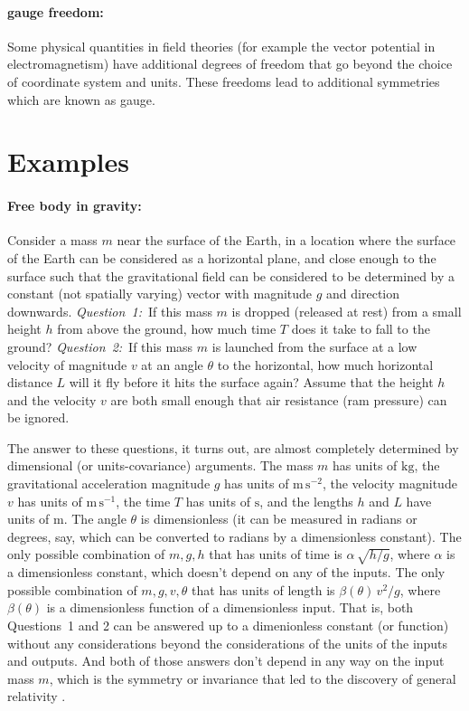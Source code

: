 \documentclass{article}
\newcommand{\unit}[1]{\mathrm{#1}}
\newcommand{\kg}{\unit{kg}}
\newcommand{\m}{\unit{m}}
\newcommand{\s}{\unit{s}}
\begin{document}
\paragraph{gauge freedom:}
Some physical quantities in field theories (for example the vector potential in electromagnetism) have additional degrees of freedom that go beyond the choice of coordinate system and units.
These freedoms lead to additional symmetries which are known as gauge.

\section{Examples}

\paragraph{Free body in gravity:}
Consider a mass $m$ near the surface of the Earth, in a location where the surface of the Earth can be considered as a horizontal plane, and close enough to the surface such that the gravitational field can be considered to be determined by a constant (not spatially varying) vector with magnitude $g$ and direction downwards.
\textsl{Question~1:}~If this mass $m$ is dropped (released at rest) from a small height $h$ from above the ground, how much time $T$ does it take to fall to the ground?
\textsl{Question~2:}~If this mass $m$ is launched from the surface at a low velocity of magnitude $v$ at an angle $\theta$ to the horizontal, how much horizontal distance $L$ will it fly before it hits the surface again?
Assume that the height $h$ and the velocity $v$ are both small enough that air resistance (ram pressure) can be ignored.

The answer to these questions, it turns out, are almost completely determined by dimensional (or units-covariance) arguments.
The mass $m$ has units of $\kg$, the gravitational acceleration magnitude $g$ has units of $\m\,\s^{-2}$, the velocity magnitude $v$ has units of $\m\,\s^{-1}$, the time $T$ has units of $\s$, and the lengths $h$ and $L$ have units of $\m$.
The angle $\theta$ is dimensionless (it can be measured in radians or degrees, say, which can be converted to radians by a dimensionless constant).
The only possible combination of $m, g, h$ that has units of time is $\alpha\,\sqrt{h/g}$, where $\alpha$ is a dimensionless constant, which doesn't depend on any of the inputs.
The only possible combination of $m, g, v, \theta$ that has units of length is $\beta(\theta)\,v^2/g$, where $\beta(\theta)$ is a dimensionless function of a dimensionless input.
That is, both Questions~1 and 2 can be answered up to a dimenionless constant (or function) without any considerations beyond the considerations of the units of the inputs and outputs.
And both of those answers don't depend in any way on the input mass $m$, which is the symmetry or invariance that led to the discovery of general relativity \cite{gr}.
\end{document}
